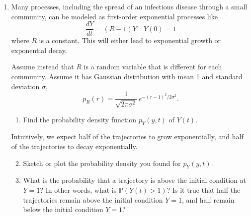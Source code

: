 \documentclass[12pt,letterpaper]{article}
\begin{document}
\begin{enumerate}







\item Many processes, including the spread of an infectious disease through a small community, can be modeled as first-order exponential processes like
\begin{equation*}
\frac{dY}{dt} = \left(R-1\right) Y \quad Y(0)=1
\end{equation*}
where $R$ is a constant. This will either lead to exponential growth or exponential decay.

Assume instead that $R$ is a random variable that is different for each community. Assume it has Gaussian distribution with mean 1 and standard deviation $\sigma$,
\begin{equation*}
p_R(r) = \frac{1}{\sqrt{2\pi \sigma^2}}\, e^{-\left(r-1\right)^2/2\sigma^2}.
\end{equation*}

\begin{enumerate}
\item Find the probability density function $p_Y(y,t)$ of $Y(t)$.
\end{enumerate}

Intuitively, we expect half of the trajectories to grow exponentially, and half of the trajectories to decay exponentially.

\begin{enumerate}
\setcounter{enumii}{1}
\item Sketch or plot the probability density you found for $p_Y(y,t)$.
\item What is the probability that a trajectory is above the initial condition at $Y=1$? In other words, what is $\mathbb{P}(Y(t)>1)$? Is it true that half the trajectories remain above the initial condition $Y=1$, and half remain below the initial condition $Y=1$? 
\end{enumerate}


\end{enumerate}
\end{document}
